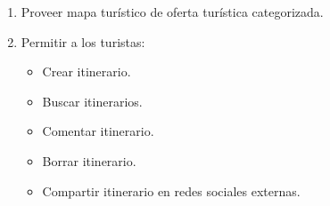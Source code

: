 \documentclass[11pt]{article}
\begin{document}
\begin{enumerate}
\begin{itemize}
	\end{itemize}
\item Proveer mapa turístico de oferta turística categorizada.
\item Permitir a los turistas:
	\begin{itemize}
		\item Crear itinerario.
		\item Buscar itinerarios.
		\item Comentar itinerario.
		\item Borrar itinerario.
		\item Compartir itinerario en redes sociales externas.		
	\end{itemize}
\end{enumerate}
\end{document}
